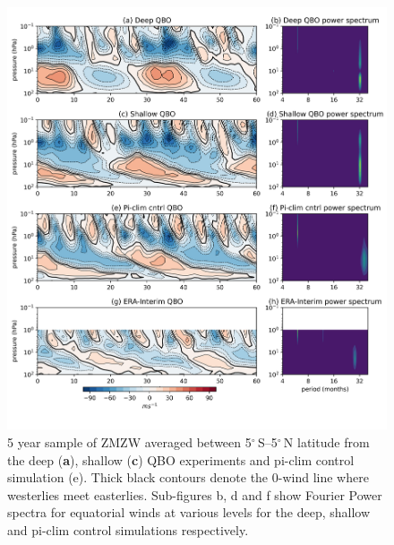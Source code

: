 \begin{figure}[h!]
\begin{center}
\noindent\includegraphics[width = \linewidth]{Figures/Figures-deepQBO/experiment_QBOs.png}
\caption[Equatorial ZMZW time-height profiles from QBO nudging experiments]{5 year sample of ZMZW averaged between 5$^{\circ}$\,S--5$^{\circ}$\,N latitude from the deep (\textbf{a}), shallow (\textbf{c}) QBO experiments and pi-clim control simulation (e). Thick black contours denote the 0-wind line where westerlies meet easterlies. Sub-figures b, d and f show Fourier Power spectra for equatorial winds at various levels for the deep, shallow and pi-clim control simulations respectively.}
\label{fig:experiment_QBOs}
\end{center}
\end{figure}

